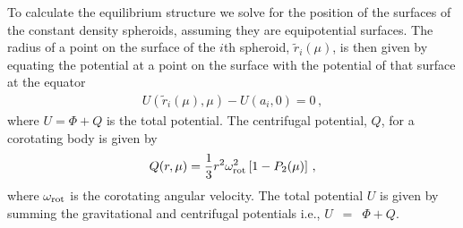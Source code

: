 \documentclass[11pt, oneside]{article}   	%
\begin{document}
To calculate the equilibrium structure we solve for the position of the surfaces of the constant density spheroids, assuming they are equipotential surfaces. 
The radius of a point on the surface of the $i$th spheroid, $\tilde{r}_i(\mu)$, is then given by equating the potential at a point on the surface with the potential of that surface at the equator
%
\begin{align}
U (\tilde{r}_i(\mu), \mu) -U(a_i,0) = 0 \, ,
\end{align}
%
where $U=\Phi+Q$ is the total potential. The centrifugal potential, $Q$, for a corotating body is given by
%
\begin{align}
\begin{aligned}
 Q (r,\mu) =\frac{1}{3} r^2 \omega_{\rm rot}^2 \left [ 1 - P_2(\mu) \right ] \,,
 \end{aligned}
\end{align}
%
where $\omega_{\rm rot}$ is the corotating angular velocity. The total potential $U$ is given by summing the gravitational and centrifugal potentials i.e.,  $U$~$=$~$\Phi+Q$.
\end{document}
